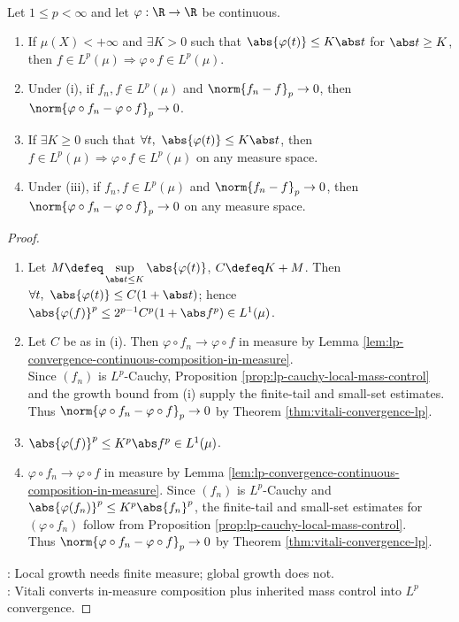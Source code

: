 \begin{theorem} \label{thm:composition-growth-criteria-lp} \\
Let $1\leq p<\infty$ and let $\varphi:\R\to\R$ be continuous.
\begin{enumerate}[label=(\roman*)]
\setlength{\itemsep}{0pt}
\item If $\mu(X)<+\infty$ and $\exists K>0$ such that $\abs{\varphi(t)}\leq K\abs t$ for $\abs t\geq K$, then $f\in L^p(\mu)\Rightarrow\varphi\circ f\in L^p(\mu)$.
\item Under (i), if $f_n,f\in L^p(\mu)$ and $\norm{f_n-f}_p\to0$, then $\norm{\varphi\circ f_n-\varphi\circ f}_p\to0$.
\item If $\exists K\geq0$ such that $\forall t,\ \abs{\varphi(t)}\leq K\abs t$, then $f\in L^p(\mu)\Rightarrow\varphi\circ f\in L^p(\mu)$ on any measure space.
\item Under (iii), if $f_n,f\in L^p(\mu)$ and $\norm{f_n-f}_p\to0$, then $\norm{\varphi\circ f_n-\varphi\circ f}_p\to0$ on any measure space.
\end{enumerate}
\begin{proof}
\begin{enumerate}[label=(\roman*)]
\setlength{\itemsep}{0pt}
\item Let $M\defeq\sup\limits_{\abs t\leq K}\abs{\varphi(t)}$, $C\defeq K+M$. Then $\forall t,\ \abs{\varphi(t)}\leq C(1+\abs t)$; hence $\abs{\varphi(f)}^p\leq2^{p-1}C^p(1+\abs f^p)\in L^1(\mu)$.
\item Let $C$ be as in (i). Then $\varphi\circ f_n\to\varphi\circ f$ in measure by Lemma \ref{lem:lp-convergence-continuous-composition-in-measure}.\\
Since $(f_n)$ is $L^p$-Cauchy, Proposition \ref{prop:lp-cauchy-local-mass-control} and the growth bound from (i) supply the finite-tail and small-set estimates. Thus $\norm{\varphi\circ f_n-\varphi\circ f}_p\to0$ by Theorem \ref{thm:vitali-convergence-lp}.
\item $\abs{\varphi(f)}^p\leq K^p\abs f^p\in L^1(\mu)$.
\item $\varphi\circ f_n\to\varphi\circ f$ in measure by Lemma \ref{lem:lp-convergence-continuous-composition-in-measure}. Since $(f_n)$ is $L^p$-Cauchy and $\abs{\varphi(f_n)}^p\leq K^p\abs{f_n}^p$, the finite-tail and small-set estimates for $(\varphi\circ f_n)$ follow from Proposition \ref{prop:lp-cauchy-local-mass-control}.\\
Thus $\norm{\varphi\circ f_n-\varphi\circ f}_p\to0$ by Theorem \ref{thm:vitali-convergence-lp}.
\end{enumerate}
: Local growth needs finite measure; global growth does not.\\
: Vitali converts in-measure composition plus inherited mass control into $L^p$ convergence.
\end{proof}
\end{theorem}

